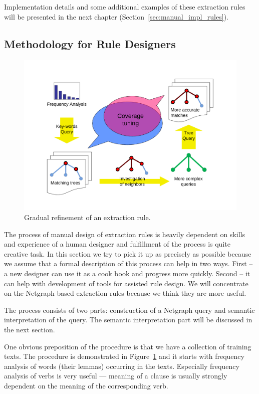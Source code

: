 Implementation details and some additional examples of these extraction rules will be presented in the next chapter (Section~\ref{sec:manual_impl_rules}).



\subsection{Methodology for Rule Designers} \label{sec:manual_rules_design}

\begin{figure}
	\centering
		\includegraphics[angle=-90, width=0.65\hsize]{coverge_tuning}
	\caption{Gradual refinement of an extraction rule.}
	\label{fig:manual_coverge_tuning}
\end{figure}


The process of manual design of extraction rules is heavily dependent on skills and experience of a human designer and fulfillment of the process is quite creative task. In this section we try to pick it up as precisely as possible because we assume that a formal description of this process can help in two ways. First -- a new designer can use it as a cook book and progress more quickly. Second -- it can help with development of tools for assisted rule design. We will concentrate on the Netgraph based extraction rules because we think they are more useful.

The process consists of two parts: construction of a Netgraph query and semantic interpretation of the query. The semantic interpretation part will be discussed in the next section.

One obvious preposition of the procedure is that we have a collection of training texts.
The procedure is demonstrated in Figure~\ref{fig:manual_coverge_tuning} and it starts with frequency analysis of words (their lemmas) occurring in the texts. Especially frequency analysis of verbs is very useful --- meaning of a clause is usually strongly dependent on the meaning of the corresponding verb.


